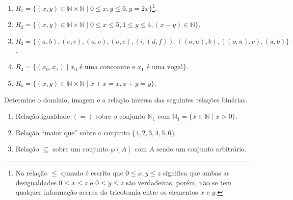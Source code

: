 \begin{enumerate}
	\item $R_1 = \{(x, y) \in \mathbb{N} \times \mathbb{N} \mid 0 \leq x, y \leq 6, y = 2x\}$\footnote{Na relação $\leq$ quando é escrito que $0 \leq x, y \leq z$ significa que ambas as desigualdades $0 \leq x\leq z$ e $0 \leq y \leq z$ são verdadeiras, porém, não se tem qualquer informação acerca da tricotomia entre os elementos $x$ e $y$.}.
	\item $R_2 = \{(x, y) \in \mathbb{N} \times \mathbb{N} \mid 0 \leq x \leq 5, 1 \leq y \leq 4, (x-y) \in \mathbb{N} \}$.
	\item $R_3 = \{(a,b), (e, c), (a, c), (o, c), (i, (d,f)), ((o, u), b), ((o, u), c), (u, b) \}$.
	\item $R_4 = \{(x_0, x_1) \mid x_0 \text{ é uma concoante e } x_1 \text{ é uma vogal} \}$.
	\item $R_5 = \{(x, y) \in \mathbb{N} \times \mathbb{N} \mid x + x = x, x + y = y\}$.
\end{enumerate}

\begin{exercise}\label{exerc:Relcacoes6}
	Determine o domínio, imagem e a relação inversa das seguintes relações binárias.
\end{exercise}

\begin{enumerate}
	\item Relação igualdade $(=)$ sobre o conjunto $\mathbb{N}_1$ com $\mathbb{N}_1 = \{x \in \mathbb{N} \mid x > 0\}$. 
	\item Relação ``maior que'' sobre o conjunto $\{1,2,3,4,5,6\}$.
	\item Relação $\subseteq$ sobre um conjunto $\wp(A)$ com $A$ sendo um conjunto arbitrário.
\end{enumerate}